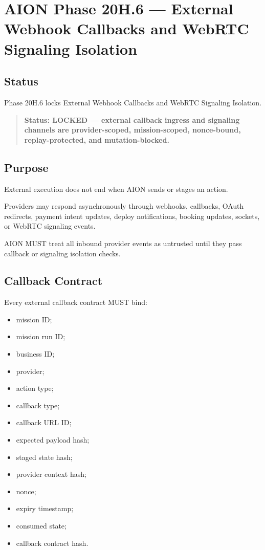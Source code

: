 \section{AION Phase 20H.6 --- External Webhook Callbacks and WebRTC Signaling Isolation}
\label{sec:aion-phase20h6-external-callback-signaling-isolation}

\subsection{Status}

Phase 20H.6 locks External Webhook Callbacks and WebRTC Signaling Isolation.

\begin{quote}
\textbf{Status: LOCKED --- external callback ingress and signaling channels are provider-scoped, mission-scoped, nonce-bound, replay-protected, and mutation-blocked.}
\end{quote}

\subsection{Purpose}

External execution does not end when AION sends or stages an action.

Providers may respond asynchronously through webhooks, callbacks, OAuth redirects, payment intent updates, deploy notifications, booking updates, sockets, or WebRTC signaling events.

AION MUST treat all inbound provider events as untrusted until they pass callback or signaling isolation checks.

\subsection{Callback Contract}

Every external callback contract MUST bind:

\begin{itemize}
  \item mission ID;
  \item mission run ID;
  \item business ID;
  \item provider;
  \item action type;
  \item callback type;
  \item callback URL ID;
  \item expected payload hash;
  \item staged state hash;
  \item provider context hash;
  \item nonce;
  \item expiry timestamp;
  \item consumed state;
  \item callback contract hash.
\end{itemize}

